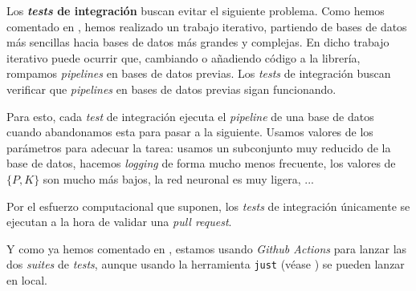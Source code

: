 Los \textbf{\textit{tests} de integración} buscan evitar el siguiente problema. Como hemos comentado en , hemos realizado un trabajo iterativo, partiendo de bases de datos más sencillas hacia bases de datos más grandes y complejas. En dicho trabajo iterativo puede ocurrir que, cambiando o añadiendo código a la librería, rompamos \textit{pipelines} en bases de datos previas. Los \textit{tests} de integración buscan verificar que \textit{pipelines} en bases de datos previas sigan funcionando.

Para esto, cada \textit{test} de integración ejecuta el \textit{pipeline} de una base de datos cuando abandonamos esta para pasar a la siguiente. Usamos valores de los parámetros para adecuar la tarea: usamos un subconjunto muy reducido de la base de datos, hacemos \textit{logging} de forma mucho menos frecuente, los valores de $\{P, K\}$ son mucho más bajos, la red neuronal es muy ligera, ...

Por el esfuerzo computacional que suponen, los \textit{tests} de integración únicamente se ejecutan a la hora de validar una \textit{pull request}.

Y como ya hemos comentado en , estamos usando \textit{Github Actions} para lanzar las dos \textit{suites} de \textit{tests}, aunque usando la herramienta \lstinline{just} (véase ) se pueden lanzar en local.
